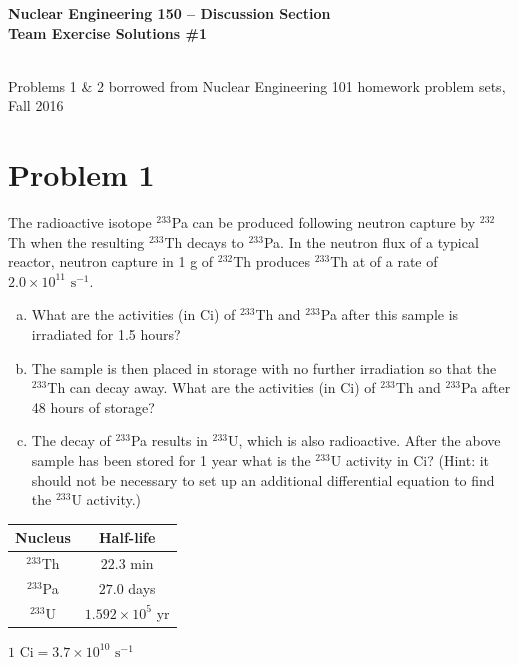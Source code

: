 \documentclass{report}
\begin{document}
\begin{center}
\textbf{\large Nuclear Engineering 150 -- Discussion Section}\\ 
\textbf{Team Exercise Solutions \#1}

\-\\
{\small *Problems 1 \& 2 borrowed from Nuclear Engineering 101 homework problem sets, Fall 2016}
\end{center}


\section*{Problem 1}
The radioactive isotope $^{233}$Pa can be produced following neutron capture by $^{232}$Th when the resulting $^{233}$Th decays to $^{233}$Pa. In the neutron flux of a typical reactor, neutron capture in 1 g of $^{232}$Th produces $^{233}$Th at of a rate of $2.0 \times 10^{11}\text{ s}^{-1}$.
\begin{enumerate}[a)]
\item What are the activities (in Ci) of $^{233}$Th and $^{233}$Pa after this sample is irradiated for 1.5 hours?
\item The sample is then placed in storage with no further irradiation so that the $^{233}$Th can decay away. What are
the activities (in Ci) of $^{233}$Th and $^{233}$Pa after 48 hours of storage?
\item The decay of $^{233}$Pa results in $^{233}$U, which is also radioactive. After the above sample has been stored for 1 year what is the $^{233}$U activity in Ci? (Hint: it should not be necessary to set up an additional differential equation to find the $^{233}$U activity.)
\end{enumerate}

\begin{table}[htbp]
	\centering
	\begin{tabular}{|c|c|}
			\hline
			Nucleus		&	Half-life \\
			\hline
			$^{233}$Th	&  $22.3$ min\\
			$^{233}$Pa	&  $27.0$ days\\
			$^{233}$U	&  $1.592 \times 10^5$ yr\\
			\hline
	\end{tabular}
	\label{tab:design-specs}
\end{table}
\begin{center}$1\text{ Ci} = 3.7 \times 10^{10}\text{ s}^{-1}$\end{center}
\end{document}
